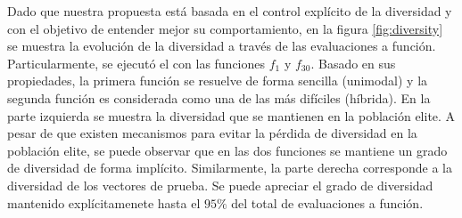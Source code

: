 Dado que nuestra propuesta está basada en el control explícito de la diversidad y con el objetivo de entender mejor su comportamiento, en la figura \ref{fig:diversity} se muestra la evolución de la diversidad a través de las evaluaciones a función.
%
Particularmente, se ejecutó el \DEEDM{} con las funciones $f_1$ y $f_{30}$.
%
Basado en sus propiedades, la primera función se resuelve de forma sencilla (unimodal) y la segunda función es considerada como una de las más difíciles (híbrida).
%
En la parte izquierda se muestra la diversidad que se mantienen en la población elite.
%
A pesar de que existen mecanismos para evitar la pérdida de diversidad en la población elite, se puede observar que en las dos funciones se mantiene un grado de diversidad de forma implícito.
%
Similarmente, la parte derecha corresponde a la diversidad de los vectores de prueba.
%
Se puede apreciar el grado de diversidad mantenido explícitamenete hasta el $95\%$ del total de evaluaciones a función.

